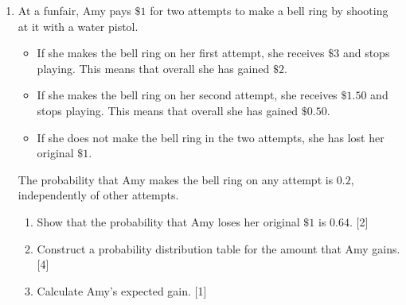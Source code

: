 \begin{enumerate}
\item  At a funfair, Amy pays $\$1$ for two attempts to make a bell ring by shooting at it with a water pistol.

\begin{itemize}
	\setlength\itemsep{0.5em}
	\item If she makes the bell ring on her first attempt, she receives $\$ 3$ and stops playing. This means	that overall she has gained $\$ 2$.
	\item  If she makes the bell ring on her second attempt, she receives $\$ 1.50$ and stops playing. This means that overall she has gained $\$ 0.50$.
	\item If she does not make the bell ring in the two attempts, she has lost her original $\$ 1$.
\end{itemize}

The probability that Amy makes the bell ring on any attempt is $0.2$, independently of other attempts.

\begin{enumerate}
	\item Show that the probability that Amy loses her original $\$1$ is $0.64$. \hfill [2]
	\item Construct a probability distribution table for the amount that Amy gains. \hfill [4]
	\item  Calculate Amy’s expected gain. \hfill [1]
\end{enumerate}





	
	
\end{enumerate}


\newpage

\exam   %


